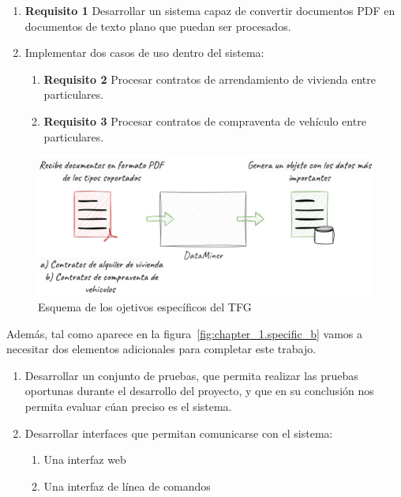 \begin{enumerate}
    \item \textbf{Requisito 1} Desarrollar un sistema capaz de convertir documentos PDF en documentos de texto
    plano que puedan ser procesados\label{req:transform_pdf_to_text}.
    \item Implementar dos casos de uso dentro del sistema:
    \begin{enumerate}
        \item \textbf{Requisito 2} Procesar contratos de arrendamiento de vivienda entre
        particulares\label{req:residence_lease_agreement}.
        \item \textbf{Requisito 3} Procesar contratos de compraventa de vehículo entre
        particulares\label{req:sale_and_purchase_agreement}.
    \end{enumerate}
\end{enumerate}

\begin{figure}[ht]
    \begin{center}
        \includegraphics[width=\textwidth]{chapter/1/images/chapter_1.specific_a}
        \caption{Esquema de los ojetivos específicos del TFG}
        \label{fig:chapter_1.specific_a}
    \end{center}
\end{figure}

Además, tal como aparece en la figura~\ref{fig:chapter_1.specific_b} vamos a necesitar dos elementos adicionales para
completar este trabajo.

\begin{enumerate}
    \item Desarrollar un conjunto de pruebas, que permita realizar las pruebas oportunas durante el desarrollo del
    proyecto, y que en su conclusión nos permita evaluar cúan preciso es el sistema.
    \item Desarrollar interfaces que permitan comunicarse con el sistema:
    \begin{enumerate}
        \item  Una interfaz web
        \item  Una interfaz de línea de comandos
    \end{enumerate}
\end{enumerate}

